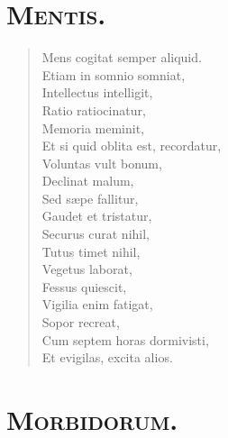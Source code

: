 \section*{\textsc{Mentis.}}


\begin{verse}

  Mens cogitat semper aliquid.\\
  Etiam in somnio somniat,\\
  Intellectus intelligit,\\
  Ratio ratiocinatur,\\
  Memoria meminit,\\
  Et si quid oblita est, recordatur,\\
  Voluntas vult bonum,\\
  Declinat malum,\\
  Sed sæpe fallitur,\\
  Gaudet et tristatur,\\
  Securus curat nihil,\\
  Tutus timet nihil,\\
  Vegetus laborat,\\
  Fessus quiescit,\\
  Vigilia enim fatigat,\\
  Sopor recreat,\\
  Cum septem horas dormivisti,\\
  Et evigilas, excita alios.\\
\end{verse}



\section*{\textsc{Morbidorum.}}


